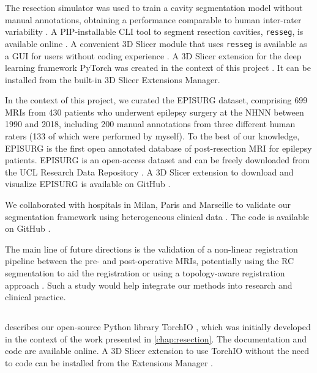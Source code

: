 The resection simulator was used to train a cavity segmentation model without manual annotations, obtaining a performance comparable to human inter-rater variability \cite{perez-garcia_simulation_2020}.
A \ac{PIP}-installable \ac{CLI} tool to segment resection cavities, \texttt{resseg}, is available online%
.
A convenient 3D Slicer module that uses \texttt{resseg} is available as a \ac{GUI} for users without coding experience%
.
A 3D Slicer extension for the deep learning framework PyTorch was created in the context of this project%
.
It can be installed from the built-in 3D Slicer Extensions Manager.

In the context of this project, we curated the EPISURG dataset, comprising 699 \acp{MRI} from 430 patients who underwent epilepsy surgery at the \ac{NHNN} between 1990 and 2018, including 200 manual annotations from three different human raters (133 of which were performed by myself).
To the best of our knowledge, EPISURG is the first open annotated database of post-resection \ac{MRI} for epilepsy patients.
EPISURG is an open-access dataset and can be freely downloaded from the UCL Research Data Repository \cite{perez-garcia_episurg_2020}.
A 3D Slicer extension to download and visualize EPISURG is available on GitHub%
.

We collaborated with hospitals in Milan, Paris and Marseille to validate our segmentation framework using heterogeneous clinical data \cite{perez-garcia_self-supervised_2021}.
The code is available on GitHub%
.

The main line of future directions is the validation of a non-linear registration pipeline between the pre- and post-operative \acp{MRI}, potentially using the \ac{RC} segmentation to aid the registration \cite{brett_spatial_2001,chen_deformable_2015} or using a topology-aware registration approach \cite{nielsen_topaware_2019}.
Such a study would help integrate our methods into research and clinical practice.


\subsection{}

 describes our open-source Python library TorchIO \cite{perez-garcia_torchio_2021}, which was initially developed in the context of the work presented in \cref{chap:resection}.
The documentation%
and code%
are available online.
A 3D Slicer extension to use TorchIO without the need to code can be installed from the Extensions Manager%
.

